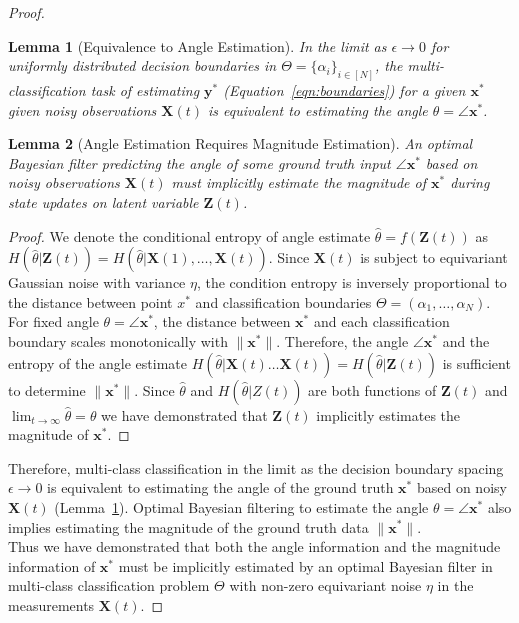 \documentclass[12pt]{article}
\newtheorem{lemma}{Lemma}
\begin{document}
\begin{proof}
	\begin{lemma}[Equivalence to Angle Estimation]
		\label{lemma:angle_equiv}
		In the limit as $\epsilon \to 0$ for uniformly distributed decision
		boundaries in $\Theta = \{\alpha_i\}_{i\in[N]}$, the
		multi-classification task of estimating $\mathbf y^*$
		(Equation~\ref{eqn:boundaries}) for a given $\mathbf x^*$ given noisy
		observations $\mathbf X(t)$ is equivalent to estimating the angle
		$\theta = \angle \mathbf x^*$. 
	\end{lemma}


	\begin{lemma}[Angle Estimation Requires Magnitude Estimation]
		\label{lemma:angle_to_magnitude}
		An optimal Bayesian filter predicting the angle of some ground truth
		input $\angle \mathbf x^*$ based on noisy observations $\mathbf X(t)$
		must implicitly estimate the magnitude of $\mathbf x^*$ during state
		updates on latent variable $\mathbf Z(t)$. 
	\end{lemma}
	\begin{proof}
		We denote the conditional entropy of angle estimate $\hat \theta =
		f(\mathbf Z(t))$ as $H(\hat \theta | \mathbf Z(t))=  H(\hat \theta |
		\mathbf X(1), \dots, \mathbf X(t))$.
		Since $\mathbf X(t)$ is subject to equivariant Gaussian noise with
		variance $\eta$, the condition entropy is inversely proportional to the
		distance between point $x^*$ and classification boundaries $\Theta =
		(\alpha_1, \dots, \alpha_N)$.  
		For fixed angle $\theta = \angle \mathbf x^*$, the distance between
		$\mathbf x^*$ and each classification boundary scales monotonically
		with $\|\mathbf x^*\|$. 
		Therefore, the angle $\angle \mathbf x^*$ and the entropy of the angle
		estimate $H(\hat \theta | \mathbf X(t) \dots \mathbf X(t)) = H(\hat
		\theta | \mathbf Z(t))$ is sufficient to determine $\|\mathbf x^*\|$. 
		Since $\hat \theta$ and $H(\hat \theta | Z(t))$ are both functions of
		$\mathbf Z(t)$ and $\lim_{t\to\infty}\hat \theta = \theta$ we have demonstrated that
		$\mathbf Z(t)$ implicitly estimates the magnitude of $\mathbf x^*$.
	\end{proof}

	Therefore, multi-class classification in the limit as the decision boundary
	spacing $\epsilon \to 0$ is equivalent to estimating the angle of the
	ground truth $\mathbf x^*$ based on noisy $\mathbf X(t)$
	(Lemma~\ref{lemma:angle_equiv}).
	Optimal Bayesian filtering to estimate the angle $\theta = \angle \mathbf
	x^*$ also implies estimating the magnitude of the ground truth data
	$\|\mathbf x^*\|$. \\


	Thus we have demonstrated that both the angle information and the magnitude
	information of $\mathbf x^*$ must be implicitly estimated by an optimal
	Bayesian filter in multi-class classification problem $\Theta$ with
	non-zero equivariant noise $\eta$ in the measurements $\mathbf X(t)$. 
\end{proof}
\end{document}
